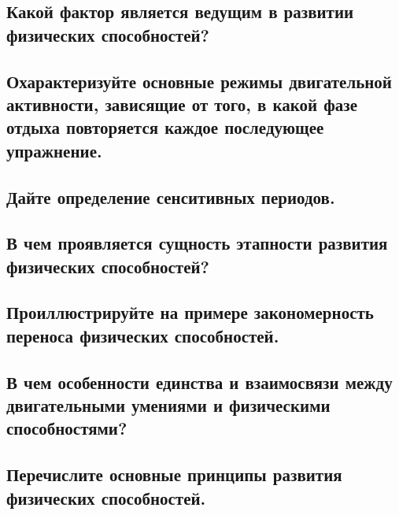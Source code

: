 \subsection{Какой фактор является ведущим в развитии физических способностей?}



\subsection{Охарактеризуйте основные режимы двигательной активности, зависящие от того, в какой фазе отдыха повторяется каждое последующее упражнение.}



\subsection{Дайте определение сенситивных периодов.}



\subsection{В чем проявляется сущность этапности развития физических способностей?}



\subsection{Проиллюстрируйте на примере закономерность переноса физических способностей.}



\subsection{В чем особенности единства и взаимосвязи между двигательными умениями и физическими способностями?}



\subsection{Перечислите основные принципы развития физических способностей.}
